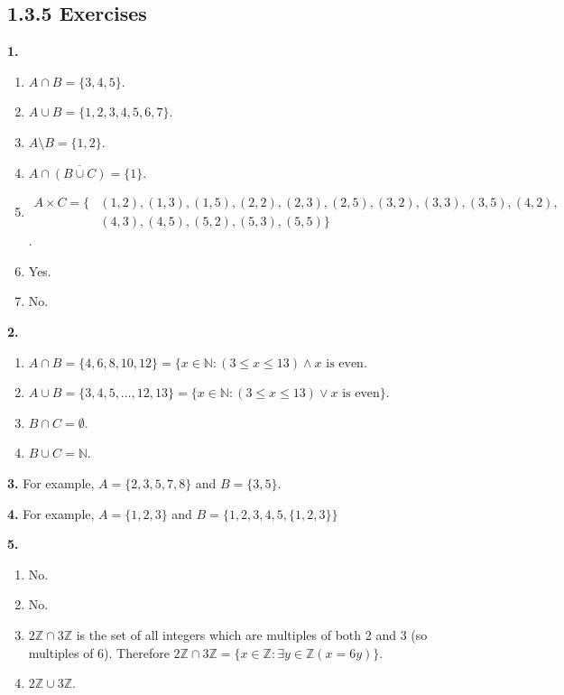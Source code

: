 \documentclass[10pt,]{book}
\theoremstyle{plain}
\theoremstyle{definition}
\theoremstyle{definition}
\theoremstyle{definition}
\numberwithin{equation}{chapter}
\def\N{\mathbb N}
\def\Z{\mathbb Z}
\def\st{:}
\renewcommand{\bar}{\overline}
\newcommand{\amp}{ & }
\begin{document}
\subsection*{1.3.5 Exercises}
\noindent\textbf{1.}\quad{}\leavevmode%
\begin{enumerate}[label=(\alph*)]
\item\hypertarget{li-235}{}\(A \cap B = \{3,4,5\}\).%
\item\hypertarget{li-236}{}\(A \cup B = \{1,2,3,4,5,6,7\}\).%
\item\hypertarget{li-237}{}\(A \setminus B = \{1,2\}\).%
\item\hypertarget{li-238}{}\(A \cap \bar{(B \cup C)} = \{1\}\).%
\item\hypertarget{li-239}{}\begin{align*}
A \times C = \{ \amp (1,2), (1,3), (1,5), (2,2), (2,3), (2,5), (3,2), (3,3), (3,5), (4,2),\\
 \amp (4,3), (4,5), (5,2), (5,3), (5,5)\}
\end{align*}.%
\item\hypertarget{li-240}{}Yes.%
\item\hypertarget{li-241}{}No.%
\end{enumerate}
\par\smallskip
\noindent\textbf{2.}\quad{}\leavevmode%
\begin{enumerate}[label=(\alph*)]
\item\hypertarget{li-246}{}\(A \cap B = \{4,6,8,10,12\} = \{x \in \N \st (3 \le x \le 13) \wedge x \mbox{ is even}\).%
\item\hypertarget{li-247}{}\(A \cup B = \{3, 4, 5, \ldots, 12, 13\} = \{x \in \N \st (3 \le x \le 13) \vee x \mbox{ is even} \}\). %
\item\hypertarget{li-248}{}\(B \cap C = \emptyset\).%
\item\hypertarget{li-249}{}\(B \cup C = \N\).%
\end{enumerate}
\par\smallskip
\noindent\textbf{3.}\quad{}
          For example, \(A = \{2,3,5,7,8\}\) and \(B = \{3,5\}\).
\par\smallskip
\noindent\textbf{4.}\quad{}
          For example, \(A = \{1,2,3\}\) and \(B = \{1,2,3,4,5,\{1,2,3\}\}\)
\par\smallskip
\noindent\textbf{5.}\quad{}\leavevmode%
\begin{enumerate}[label=(\alph*)]
\item\hypertarget{li-254}{} No. %
\item\hypertarget{li-255}{} No. %
\item\hypertarget{li-256}{}\(2\Z \cap 3\Z\) is the set of all integers which are multiples of both 2 and 3 (so multiples of 6). Therefore \(2\Z \cap 3\Z = \{x \in \Z \st \exists y\in \Z(x = 6y)\}\).%
\item\hypertarget{li-257}{}\(2\Z \cup 3\Z\).%
\end{enumerate}
\end{document}
